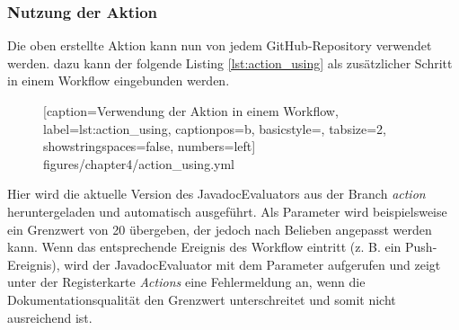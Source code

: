 \subsubsection{Nutzung der Aktion}

Die oben erstellte Aktion kann nun von jedem GitHub-Repository verwendet werden. dazu kann der folgende Listing \ref{lst:action_using} als zusätzlicher Schritt in einem Workflow eingebunden werden. 
\begin{figure} [htbp]

[caption={Verwendung der Aktion in einem Workflow},
label={lst:action_using},
captionpos=b, basicstyle=\footnotesize, tabsize=2, showstringspaces=false,  numbers=left]
{figures/chapter4/action_using.yml}
\end{figure}

Hier wird die aktuelle Version des JavadocEvaluators aus der Branch \textit{action} heruntergeladen und automatisch ausgeführt. Als Parameter wird beispielsweise ein Grenzwert von 20 übergeben, der jedoch nach Belieben angepasst werden kann. Wenn das entsprechende Ereignis des Workflow eintritt (z. B. ein Push-Ereignis), wird der JavadocEvaluator mit dem Parameter aufgerufen und zeigt unter der Registerkarte \textit{Actions} eine Fehlermeldung an, wenn die Dokumentationsqualität den Grenzwert unterschreitet und somit nicht ausreichend ist.
